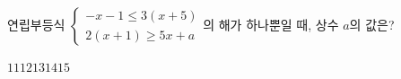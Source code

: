 연립부등식 $\begin{cases} -x-1\le 3(x+5) \\ 2(x+1)\ge 5x+a \end{cases}$의 해가 하나뿐일 때, 상수 $a$의 값은?
\begin{choices32}{$11$}{$12$}{$13$}{$14$}{$15$}\end{choices32}
